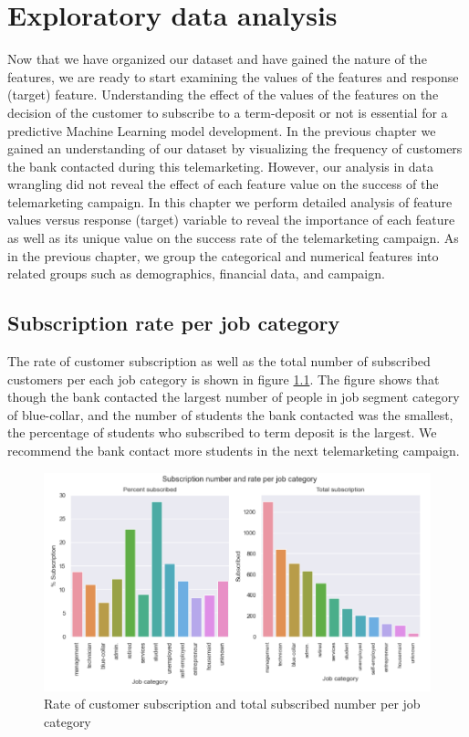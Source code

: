 \chapter{Exploratory data analysis}
Now that we have organized our dataset and have gained the nature of the features, we are ready to start examining the values of the features and response (target) feature. Understanding the effect of the values of the features on the decision of the customer to subscribe to a term-deposit or not is essential for a predictive Machine Learning model development. In the previous chapter we gained an understanding of our dataset by visualizing the frequency of customers the bank contacted during this telemarketing. However, our analysis in data wrangling did not reveal the effect of each feature value on the success of the telemarketing campaign. In this chapter we perform detailed analysis of feature values versus response (target) variable to reveal the importance of each feature as well as its unique value on the success rate of the telemarketing campaign. As in the previous chapter, we group the categorical and numerical features into related groups such as demographics, financial data, and campaign. 

\section{Subscription rate per job category}
The rate of customer subscription as well as the total number of subscribed customers per each job category is shown in figure \ref{fig:job_rate}. The figure shows that though the bank contacted the largest number of people in job segment category of blue-collar, and the number of students the bank contacted was the smallest, the percentage of students who subscribed to term deposit is the largest. We recommend the bank contact more students in the next telemarketing campaign.

\begin{figure}[tbh]
\centering
\includegraphics[width = 1.0\hsize]{./resources/img/fig_job_rate.png}
\caption{Rate of customer subscription and total subscribed number per job category} 
\label{fig:job_rate}
\end{figure}

